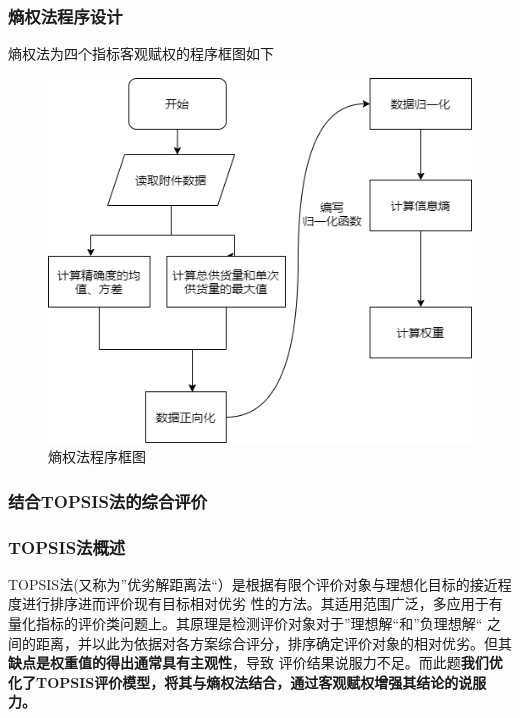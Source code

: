 \documentclass{cumcmthesis}
\begin{document}
\subsubsection*{熵权法程序设计}
熵权法为四个指标客观赋权的程序框图如下
\begin{figure}[H]
    \centering
    \includegraphics[scale=0.6]{shangquan.png}
    \caption{熵权法程序框图}     \label{fig:2}
    \end{figure}
\subsubsection{结合TOPSIS法的综合评价}
\subsubsection*{TOPSIS法概述}
TOPSIS法(又称为”优劣解距离法“）是根据有限个评价对象与理想化目标的接近程度进行排序进而评价现有目标相对优劣
性的方法。其适用范围广泛，多应用于有量化指标的评价类问题上。其原理是检测评价对象对于”理想解“和”负理想解“
之间的距离，并以此为依据对各方案综合评分，排序确定评价对象的相对优劣。但其\textbf{缺点是权重值的得出通常具有主观性}，导致
评价结果说服力不足。而此题\textbf{我们优化了TOPSIS评价模型，将其与熵权法结合，通过客观赋权增强其结论的说服力。}
\end{document}
